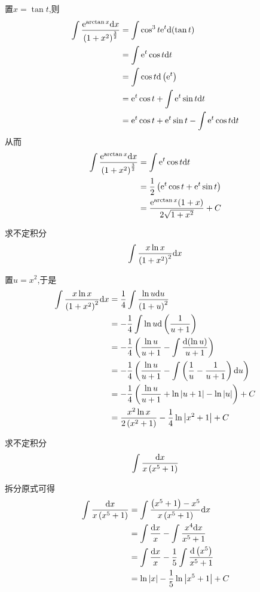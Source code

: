\documentclass{ctexart}
\begin{document}
\begin{solution}
    置$x=\tan t$,则
    $$\begin{aligned}
        \int\dfrac{\mathrm{e}^{\arctan{x}}\mathrm{d} x}{\left(1+x^2\right)^\frac{3}{2}}
        &= \int{\cos^3t\mathrm{e}^t\mathrm{d}(\tan t)} \\
        &= \int{\mathrm{e}^t\cos t\mathrm{d}t} \\
        &= \int{\cos t\mathrm{d}\left(\mathrm{e}^t\right)} \\
        &= \mathrm{e}^t\cos t+\int{\mathrm{e}^t\sin t\mathrm{d}t} \\
        &= \mathrm{e}^t\cos t+\mathrm{e}^t\sin t-\int{\mathrm{e}^t\cos t\mathrm{d}t}
    \end{aligned}$$
    从而$$\begin{aligned}
        \int\dfrac{\mathrm{e}^{\arctan{x}}\mathrm{d} x}{\left(1+x^2\right)^\frac{3}{2}}
        &= \int{\mathrm{e}^t\cos t\mathrm{d}t} \\
        &= \dfrac{1}{2}\left(\mathrm{e}^t\cos t+\mathrm{e}^t\sin t\right) \\
        &= \dfrac{\mathrm{e}^{\arctan{x}}(1+x)}{2\sqrt{1+x^2}}+C
    \end{aligned}$$
\end{solution}
\begin{problem}[Problem 7.]
    求不定积分$$\int{\dfrac{x\ln{x}}{\left(1+x^2\right)^2}\mathrm{d}x}$$
\end{problem}
\begin{solution}[Solution.]
    置$u=x^2$,于是
    $$\begin{aligned}
        \int{\dfrac{x\ln{x}}{\left(1+x^2\right)^2}\mathrm{d}x}
        &= \dfrac{1}{4}\int\dfrac{\ln u\mathrm{d} u}{\left(1+u\right)^2} \\
        &= -\dfrac{1}{4}\int\ln u\mathrm{d}\left(\dfrac{1}{u+1}\right) \\
        &= -\dfrac{1}{4}\left(\dfrac{\ln u}{u+1}-\int\dfrac{\mathrm{d}(\ln u)}{u+1}\right) \\
        &= -\dfrac{1}{4}\left(\dfrac{\ln u}{u+1}-\int\left(\dfrac{1}{u}-\dfrac{1}{u+1}\right)\mathrm{d} u\right) \\
        &= -\dfrac{1}{4}\left(\dfrac{\ln u}{u+1}+\ln\left|u+1\right|-\ln\left|u\right|\right)+C \\
        &= \dfrac{x^2\ln x}{2\left(x^2+1\right)}-\dfrac{1}{4}\ln\left|x^2+1\right|+C
    \end{aligned}$$
\end{solution}
\begin{problem}[Problem 8.]
    求不定积分$$\int{\dfrac{\mathrm{d}x}{x\left(x^5+1\right)}}$$
\end{problem}
\begin{solution}[Solution.]
    拆分原式可得
    $$\begin{aligned}
        \int{\dfrac{\mathrm{d}x}{x\left(x^5+1\right)}}
        &= \int{\dfrac{\left(x^5+1\right)-x^5}{x\left(x^5+1\right)}\mathrm{d}x} \\
        &= \int\dfrac{\mathrm{d} x}{x}-\int\dfrac{x^4\mathrm{d} x}{x^5+1} \\
        &= \int\dfrac{\mathrm{d} x}{x}-\dfrac{1}{5}\int\dfrac{\mathrm{d}\left(x^5\right)}{x^5+1} \\
        &= \ln{\left|x\right|}-\dfrac{1}{5}\ln{\left|x^5+1\right|}+C
    \end{aligned}$$
\end{solution}
\end{document}
